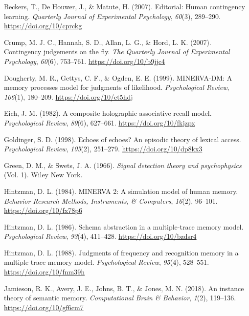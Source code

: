 \documentclass[
  english,
  man,floatsintext]{apa6}
\begin{document}
\leavevmode\hypertarget{ref-beckersEditorialHumanContingency2007}{}%
Beckers, T., De Houwer, J., \& Matute, H. (2007). Editorial: Human contingency learning. \emph{Quarterly Journal of Experimental Psychology}, \emph{60}(3), 289--290. \url{https://doi.org/10/cprckg}

\leavevmode\hypertarget{ref-crumpContingencyJudgementsFly2007}{}%
Crump, M. J. C., Hannah, S. D., Allan, L. G., \& Hord, L. K. (2007). Contingency judgements on the fly. \emph{The Quarterly Journal of Experimental Psychology}, \emph{60}(6), 753--761. \url{https://doi.org/10/b9jjc4}

\leavevmode\hypertarget{ref-doughertyMINERVADMMemoryProcesses1999}{}%
Dougherty, M. R., Gettys, C. F., \& Ogden, E. E. (1999). MINERVA-DM: A memory processes model for judgments of likelihood. \emph{Psychological Review}, \emph{106}(1), 180--209. \url{https://doi.org/10/ct5hdj}

\leavevmode\hypertarget{ref-eichCompositeHolographicAssociative1982}{}%
Eich, J. M. (1982). A composite holographic associative recall model. \emph{Psychological Review}, \emph{89}(6), 627--661. \url{https://doi.org/10/fkjzpx}

\leavevmode\hypertarget{ref-goldingerEchoesEchoesEpisodic1998}{}%
Goldinger, S. D. (1998). Echoes of echoes? An episodic theory of lexical access. \emph{Psychological Review}, \emph{105}(2), 251--279. \url{https://doi.org/10/dp8kx3}

\leavevmode\hypertarget{ref-greenSignalDetectionTheory1966}{}%
Green, D. M., \& Swets, J. A. (1966). \emph{Signal detection theory and psychophysics} (Vol. 1). Wiley New York.

\leavevmode\hypertarget{ref-hintzmanMINERVASimulationModel1984}{}%
Hintzman, D. L. (1984). MINERVA 2: A simulation model of human memory. \emph{Behavior Research Methods, Instruments, \& Computers}, \emph{16}(2), 96--101. \url{https://doi.org/10/fx78p6}

\leavevmode\hypertarget{ref-hintzmanSchemaAbstractionMultipletrace1986}{}%
Hintzman, D. L. (1986). Schema abstraction in a multiple-trace memory model. \emph{Psychological Review}, \emph{93}(4), 411--428. \url{https://doi.org/10/bzdsr4}

\leavevmode\hypertarget{ref-hintzmanJudgmentsFrequencyRecognition1988}{}%
Hintzman, D. L. (1988). Judgments of frequency and recognition memory in a multiple-trace memory model. \emph{Psychological Review}, \emph{95}(4), 528--551. \url{https://doi.org/10/fnm39h}

\leavevmode\hypertarget{ref-jamiesonInstanceTheorySemantic2018}{}%
Jamieson, R. K., Avery, J. E., Johns, B. T., \& Jones, M. N. (2018). An instance theory of semantic memory. \emph{Computational Brain \& Behavior}, \emph{1}(2), 119--136. \url{https://doi.org/10/gf6cm7}
\end{document}
